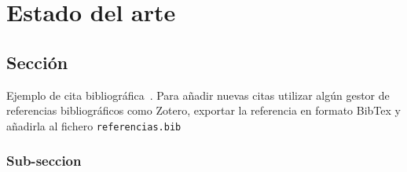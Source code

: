 \chapter{Estado del arte}\label{cap:estado_del_arte}

\section{Sección}\label{sec:seccion}
Ejemplo de cita bibliográfica~\cite{leo_federated_2014}. Para añadir nuevas citas utilizar algún gestor de referencias bibliográficos como Zotero, exportar la referencia en formato BibTex y añadirla al fichero \texttt{referencias.bib}



\subsection{Sub-seccion}\label{sec:subsection}

